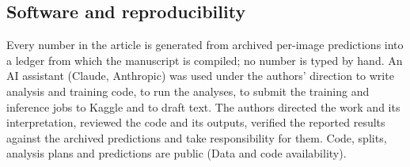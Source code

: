 \subsection{Software and reproducibility}

Every number in the article is generated from archived per-image predictions into a ledger from
which the manuscript is compiled; no number is typed by hand. An AI assistant (Claude, Anthropic)
was used under the authors' direction to write analysis and training code, to run the analyses, to
submit the training and inference jobs to Kaggle and to draft text. The authors directed the work
and its interpretation, reviewed the code and its outputs, verified the reported results against
the archived predictions and take responsibility for them. Code, splits, analysis plans and
predictions are public (Data and code availability).

